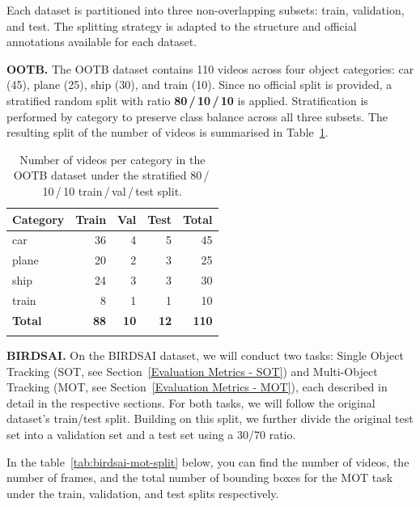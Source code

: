 \documentclass[
]{article}
\begin{document}
Each dataset is partitioned into three non-overlapping subsets: train, validation, and test. 
The splitting strategy is adapted to the structure and official annotations available for each dataset.

\textbf{OOTB.} The OOTB dataset\cite{chen2022single} contains 110 videos across four object categories: car (45), plane (25), ship (30), and train (10). 
Since no official split is provided, a stratified random split with ratio \textbf{80\,/\,10\,/\,10} is applied. 
Stratification is performed by category to preserve class balance across all three subsets. The resulting split of the number of videos is summarised in Table~\ref{tab:ootb-split}.

\renewcommand{\arraystretch}{1.3}
\begin{longtable}[c]{@{}lrrrr@{}}
\rowcolor{gray!20}
\textbf{Category} & \textbf{Train} & \textbf{Val} & \textbf{Test} & \textbf{Total} \\
\midrule
\endhead
car   & 36 & 4 &  5 &  45 \\
plane & 20 & 2 &  3 &  25 \\
ship  & 24 & 3 &  3 &  30 \\
train &  8 & 1 &  1 &  10 \\
\midrule
\textbf{Total} & \textbf{88} & \textbf{10} & \textbf{12} & \textbf{110} \\
\caption{Number of videos per category in the OOTB dataset\cite{chen2022single} under the stratified 80\,/\,10\,/\,10 train\,/\,val\,/\,test split.\label{tab:ootb-split}}\\
\end{longtable}
\renewcommand{\arraystretch}{1}

\textbf{BIRDSAI.} On the BIRDSAI dataset, we will conduct two tasks: Single Object Tracking (SOT, see Section~\ref{Evaluation Metrics - SOT}) and Multi-Object Tracking (MOT, see Section~\ref{Evaluation Metrics - MOT}), each described in detail in the respective sections.
For both tasks, we will follow the original dataset's train/test split. Building on this split, we further divide the original test set into a validation set and a test set using a 30/70 ratio.

In the table~\ref{tab:birdsai-mot-split} below, you can find the number of videos, the number of frames, and the total number of bounding boxes for the MOT task under the train, validation, and test splits respectively.
\end{document}
